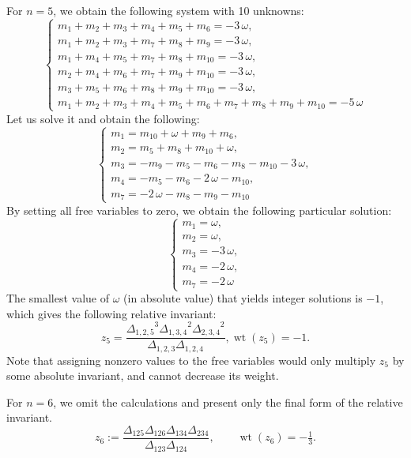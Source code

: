\documentclass[12pt,reqno]{amsart}
\begin{document}
For  $n=5$,    we obtain the following system with 10 unknowns:
$$
\begin{cases}
 m_{{1}}+m_{{2}}+m_{{3}}+m_{{4}}+m_{{5}}+m_{{6}}=-3\,\omega,\\
m_{{1}}+m_{{2}}+m_{{3}}+m_{{7}}+m_{{8}}+m_{{9}}=-3\,\omega, \\
m_{{1}}+m_{{4
}}+m_{{5}}+m_{{7}}+m_{{8}}+m_{{10}}=-3\,\omega,\\ m_{{2}}+m_{{4}}+m_{{6}}
+m_{{7}}+m_{{9}}+m_{{10}}=-3\,\omega,\\ m_{{3}}+m_{{5}}+m_{{6}}+m_{{8}}+m
_{{9}}+m_{{10}}=-3\,\omega,\\m_{{1}}+m_{{2}}+m_{{3}}+m_{{4}}+m_{{5}}+m_{
{6}}+m_{{7}}+m_{{8}}+m_{{9}}+m_{{10}}=-5\,\omega 
\end{cases}
$$
Let us solve it and obtain the following:
$$
\begin{cases}
 m_{{1}}=m_{{10}}+\omega+m_{{9}}+m_{{6}},\\
m_{{2}}=m_{{5}}+m_{{8
}}+m_{{10}}+\omega, \\
m_{{3}}=-m_{{9}}-m_{{5}}-m_{{6}}-m_{{8}}-m_{{10}}-3
\,\omega,\\
m_{{4}}=-m_{{5}}-m_{{6}}-2\,\omega-m_{{10}},\\
m_{{7}}=-2\,\omega-m_{{8}}-m_{{9}}-m_{{10}}
\end{cases}
$$
By setting all free variables to zero, we obtain the following particular solution:
$$
\begin{cases}
 m_{{1}}=\omega,\\
m_{{2}}=\omega, \\
m_{{3}}=-3
\,\omega,\\
m_{{4}}=-2\,\omega,\\
m_{{7}}=-2\,\omega
\end{cases}
$$
The smallest value of $\omega$  (in absolute value) that yields integer solutions is $-1$, which gives the following relative invariant:
$$
z_5={\frac {{\Delta_{{1,2,5}}}^{3}{\Delta_{{1,3,4}}}^{2}{\Delta_{{2,3,4}}}
^{2}}{\Delta_{{1,2,3}}\Delta_{{1,2,4}}}},\operatorname{wt}(z_5) = -1.
$$
Note that assigning nonzero values to the free variables would only multiply $z_5$  by some absolute invariant, and cannot decrease its weight.

For $n=6$, we omit the calculations and present only the final form of the relative invariant.
\[
z_6 := \frac{ \Delta_{125} \Delta_{126} \Delta_{134} \Delta_{234} }
             { \Delta_{123} \Delta_{124} }, \qquad \operatorname{wt}(z_6) = -\tfrac13.
\]
\end{document}
